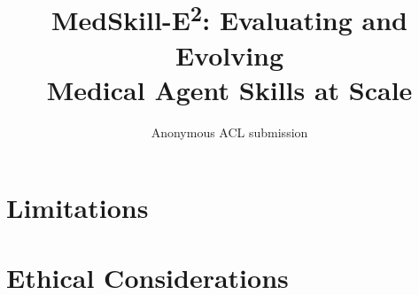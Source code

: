 \documentclass[11pt]{article}
\title{MedSkill-E\textsuperscript{2}: Evaluating and Evolving \\
       Medical Agent Skills at Scale}
\author{Anonymous ACL submission}
\theoremstyle{plain}
\theoremstyle{definition}
\begin{document}
\linenumbers
\maketitle








\section*{Limitations}


\section*{Ethical Considerations}




\clearpage
\appendix

\end{document}
